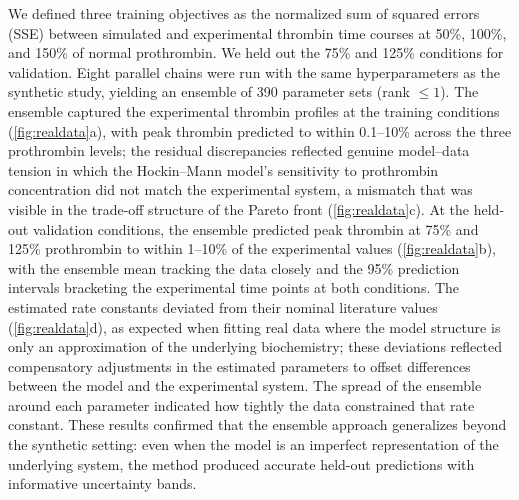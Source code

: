 \documentclass[12pt]{article}
\begin{document}
We defined three training objectives as the normalized sum of squared errors (SSE) between simulated and experimental thrombin time courses at 50\%, 100\%, and 150\% of normal prothrombin. We held out the 75\% and 125\% conditions for validation. Eight parallel chains were run with the same hyperparameters as the synthetic study, yielding an ensemble of 390 parameter sets (rank $\leq 1$). The ensemble captured the experimental thrombin profiles at the training conditions (\cref{fig:realdata}a), with peak thrombin predicted to within 0.1--10\% across the three prothrombin levels; the residual discrepancies reflected genuine model--data tension in which the Hockin--Mann model's sensitivity to prothrombin concentration did not match the experimental system, a mismatch that was visible in the trade-off structure of the Pareto front (\cref{fig:realdata}c). At the held-out validation conditions, the ensemble predicted peak thrombin at 75\% and 125\% prothrombin to within 1--10\% of the experimental values (\cref{fig:realdata}b), with the ensemble mean tracking the data closely and the 95\% prediction intervals bracketing the experimental time points at both conditions. The estimated rate constants deviated from their nominal literature values (\cref{fig:realdata}d), as expected when fitting real data where the model structure is only an approximation of the underlying biochemistry; these deviations reflected compensatory adjustments in the estimated parameters to offset differences between the model and the experimental system. The spread of the ensemble around each parameter indicated how tightly the data constrained that rate constant. These results confirmed that the ensemble approach generalizes beyond the synthetic setting: even when the model is an imperfect representation of the underlying system, the method produced accurate held-out predictions with informative uncertainty bands.

\end{document}
